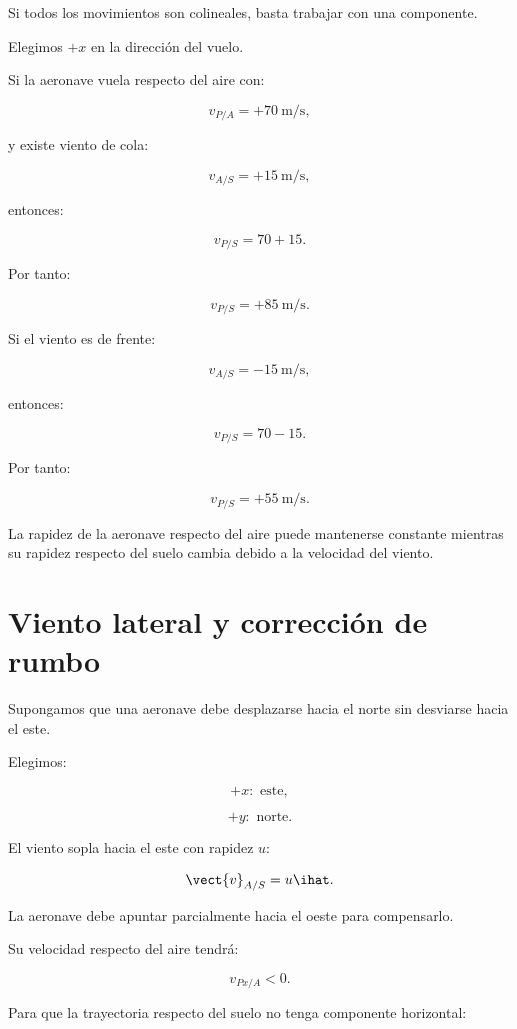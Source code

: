 Si todos los movimientos son colineales,
basta trabajar con una componente.

Elegimos \(+x\) en la dirección del vuelo.

Si la aeronave vuela respecto del aire con:

\[
v_{P/A}=+\SI{70}{\meter\per\second},
\]

y existe viento de cola:

\[
v_{A/S}=+\SI{15}{\meter\per\second},
\]

entonces:

\[
v_{P/S}=70+15.
\]

Por tanto:

\[
\boxed{
v_{P/S}=+\SI{85}{\meter\per\second}
}.
\]

Si el viento es de frente:

\[
v_{A/S}=-\SI{15}{\meter\per\second},
\]

entonces:

\[
v_{P/S}=70-15.
\]

Por tanto:

\[
\boxed{
v_{P/S}=+\SI{55}{\meter\per\second}
}.
\]

\begin{interpretacion}

La rapidez de la aeronave respecto del aire
puede mantenerse constante mientras
su rapidez respecto del suelo cambia
debido a la velocidad del viento.

\end{interpretacion}


\section{Viento lateral y corrección de rumbo}

Supongamos que una aeronave debe desplazarse
hacia el norte sin desviarse hacia el este.

Elegimos:

\[
+x:\text{ este},
\]

\[
+y:\text{ norte}.
\]

El viento sopla hacia el este con rapidez \(u\):

\[
\vect{v}_{A/S}=u\ihat.
\]

La aeronave debe apuntar parcialmente
hacia el oeste para compensarlo.

Su velocidad respecto del aire tendrá:

\[
v_{Px/A}<0.
\]

Para que la trayectoria respecto del suelo
no tenga componente horizontal:


